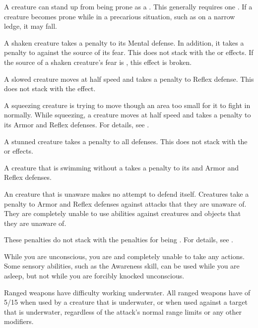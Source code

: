     A creature can stand up from being prone as a .
    This generally requires one .
    If a creature becomes prone while in a precarious situation, such as on a narrow ledge, it may fall.

     A shaken creature takes a  penalty to its Mental defense.
    In addition, it takes a  penalty to  against the source of its fear.
    This does not stack with the \frightened or \panicked effects.
    If the source of a shaken creature's fear is , this effect is broken.

     A slowed creature moves at half speed and takes a  penalty to Reflex defense.
    This does not stack with the \immobilized effect.

     A squeezing creature is trying to move though an area too small for it to fight in normally.
    While squeezing, a creature moves at half speed and takes a  penalty to its Armor and Reflex defenses.
    For details, see .

     A stunned creature takes a  penalty to all defenses.
    This does not stack with the \dazed or \confused effects.

     A creature that is swimming without a  takes a  penalty to its  and Armor and Reflex defenses.

     An creature that is unaware makes no attempt to defend itself.
    Creatures take a  penalty to Armor and Reflex defenses against attacks that they are unaware of.
    They are completely unable to use  abilities against creatures and objects that they are unaware of.

    These penalties do not stack with the penalties for being \partiallyunaware.
    For details, see .

     While you are unconscious, you are \helpless and completely unable to take any actions.
    Some sensory abilities, such as the Awareness skill, can be used while you are asleep, but not while you are forcibly knocked unconscious.

     Ranged weapons have difficulty working underwater.
    All ranged weapons have  of 5/15 when used by a creature that is underwater, or when used against a target that is underwater, regardless of the attack's normal range limits or any other modifiers.


